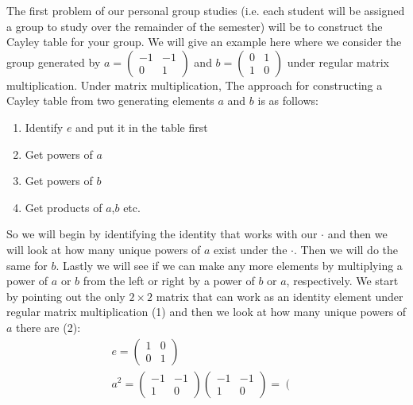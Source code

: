 \begin{example}
\label{ex:ConstructingFromGenerators}

\noindent The first problem of our personal group studies (i.e. each student will be assigned a group to study over the remainder of the semester) will be to construct the Cayley table for your group. We will give an example here where we consider the group generated by $a=\left(\begin{matrix}
-1 & -1 \\
0 & 1
\end{matrix}\right)$ and $b=\left(\begin{matrix}
0 & 1 \\
1 & 0
\end{matrix}\right)$ under regular matrix multiplication. Under matrix multiplication,
The approach for constructing a Cayley table from two generating elements $a$ and $b$ is as follows:
\begin{enumerate}
    \item Identify $e$ and put it in the table first
    \item Get powers of $a$
    \item Get powers of $b$
    \item Get products of $a$,$b$ etc.
\end{enumerate}
So we will begin by identifying the identity that works with our $\cdot$ and then we will look at
how many unique powers of $a$ exist under the $\cdot$. Then we will do the same for $b$. Lastly we
will see if we can make any more elements by multiplying a power of $a$ or $b$ from the left or
right by a power of $b$ or $a$, respectively. We start by pointing out the only $2\times 2$ matrix
that can work as an identity element under regular matrix multiplication (1) and then we look at how
many unique powers of $a$ there are (2):
\begin{align}
    e =\left(\begin{matrix}
1 & 0 \\
0 & 1
\end{matrix}\right)\nonumber \\
a^2=\left(\begin{matrix}
-1 & -1 \\
1 & 0
\end{matrix}\right)\left(\begin{matrix}
-1 & -1 \\
1 & 0
\end{matrix}\right)=\left(\begin{matrix}

\end{matrix}
\end{align}
\end{example}
